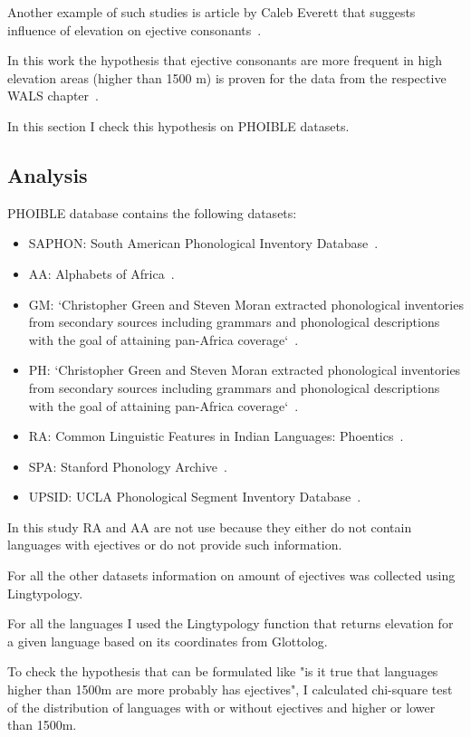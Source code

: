 \documentclass[a4paper,12pt]{article}
\begin{document}
Another example of such studies is article by Caleb Everett that suggests influence of elevation on ejective consonants~\parencite{ejectives}.

In this work the hypothesis that ejective consonants are more frequent in high elevation areas (higher than 1500 m) is proven for the data from the respective WALS chapter~\parencite{wals7}.

In this section I check this hypothesis on PHOIBLE datasets.

\subsection{Analysis}

PHOIBLE database contains the following datasets:
\begin{itemize}
 \item SAPHON: South American Phonological Inventory Database~\parencite{saphon}.
 \item AA: Alphabets of Africa~\parencite{aa}.
 \item GM: `Christopher Green and Steven Moran extracted phonological inventories from secondary sources including grammars and phonological descriptions with the goal of attaining pan-Africa coverage`~\parencite{gm}.
 \item PH: `Christopher Green and Steven Moran extracted phonological inventories from secondary sources including grammars and phonological descriptions with the goal of attaining pan-Africa coverage`~\parencite{gm}.
 \item RA: Common Linguistic Features in Indian Languages: Phoentics~\parencite{ra}.
 \item SPA: Stanford Phonology Archive~\parencite{spa}.
 \item UPSID: UCLA Phonological Segment Inventory Database~\parencite{upsid}.
\end{itemize}

In this study RA and AA are not use because they either do not contain languages with ejectives or do not provide such information.

For all the other datasets information on amount of ejectives was collected using Lingtypology.

For all the languages I used the Lingtypology function that returns elevation for a given language based on its coordinates from Glottolog.

To check the hypothesis that can be formulated like "is it true that languages higher than 1500m are more probably has ejectives", I calculated chi-square test of the distribution of languages with or without ejectives and higher or lower than 1500m.
\end{document}
